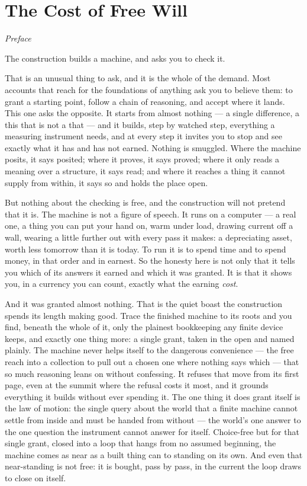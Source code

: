 \chapter*{The Cost of Free Will}

\begin{center}\textit{Preface}\end{center}

\bigskip

The construction builds a machine, and asks you to check it.

That is an unusual thing to ask, and it is the whole of the demand. Most accounts that reach for the foundations
of anything ask you to believe them: to grant a starting point, follow a chain of reasoning, and accept where it
lands. This one asks the opposite. It starts from almost nothing --- a single difference, a
this that is not a that --- and it builds, step by watched step, everything a measuring instrument needs, and at
every step it invites you to stop and see exactly what it has and has not earned. Nothing is smuggled. Where the
machine posits, it says posited; where it proves, it says proved; where it only reads a meaning over a structure,
it says read; and where it reaches a thing it cannot supply from within, it says so and holds the place open.

But nothing about the checking is free, and the construction will not pretend that it is. The machine is not a figure of
speech. It runs on a computer --- a real one, a thing you can put your hand on, warm under load, drawing current
off a wall, wearing a little further out with every pass it makes: a depreciating asset, worth less tomorrow than
it is today. To run it is to spend time and to spend money, in that order and in earnest. So the honesty here is
not only that it tells you which of its answers it earned and which it was granted. It is that it shows you, in a
currency you can count, exactly what the earning \emph{cost}.

And it was granted almost nothing. That is the quiet boast the construction spends its length making good. Trace
the finished machine to its roots and you find, beneath the whole of it, only the plainest bookkeeping any finite
device keeps, and exactly one thing more: a single grant, taken in the open and named plainly. The machine never
helps itself to the dangerous convenience --- the free reach into a collection to pull out a chosen one where
nothing says which --- that so much reasoning leans on without confessing. It refuses that move from its first
page, even at the summit where the refusal costs it most, and it grounds everything it builds without ever
spending it. The one thing it does grant itself is the law of motion: the single query about the world that a
finite machine cannot settle from inside and must be handed from without --- the world's one answer to the one
question the instrument cannot answer for itself. Choice-free but for that single grant, closed into a loop that
hangs from no assumed beginning, the machine comes as near as a built thing can to standing on its own. And even
that near-standing is not free: it is bought, pass by pass, in the current the loop draws to close on itself.

